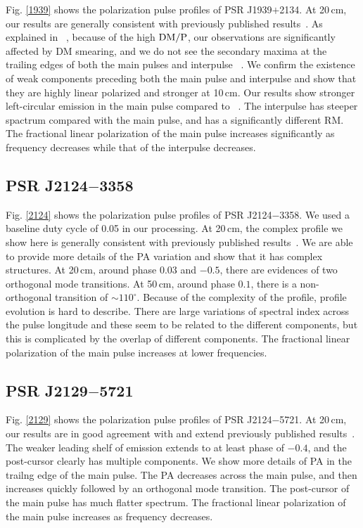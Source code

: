 \documentclass[useAMS,usenatbib]{mn2e}
\begin{document}
\begin{appendix}
Fig. \ref{1939} shows the polarization pulse profiles of 
PSR J1939$+$2134.
%
At 20\,cm, our results are generally consistent with previously published 
results~\citep{Yan11}.
%
As explained in ~\citet{Yan11}, because of the high $\rm{DM}/P$, our observations 
are significantly affected by DM smearing, and we do not see the secondary 
maxima at the trailing edges of both the main pulses and interpulse
~\citep{Thorsett90,Stairs99,Ord04}.
%
We confirm the existence of weak components preceding both the main pulse 
and interpulse and show that they are highly linear polarized and stronger 
at 10\,cm. 
%
Our results show stronger left-circular emission in the main pulse compared 
to ~\citet{Yan11}.
%
The interpulse has steeper spactrum compared with the main pulse, and has 
a significantly different RM.
%
The fractional linear polarization of the main pulse increases significantly 
as frequency decreases while that of the interpulse decreases.

\subsection{PSR J2124$-$3358}

Fig. \ref{2124} shows the polarization pulse profiles of 
PSR J2124$-$3358.
%
We used a baseline duty cycle of 0.05 in our processing.
%
At 20\,cm, the complex profile we show here is generally consistent with 
previously published results~\citep{Yan11}.
%
We are able to provide more details of the PA variation and show that it has 
complex structures.
%
At 20\,cm, around phase $0.03$ and $-0.5$, there are evidences of two 
orthogonal mode transitions.
%
At 50\,cm, around phase $0.1$, there is a non-orthogonal transition of 
$\sim110^{\circ}$.
%
Because of the complexity of the profile, profile evolution is hard to 
describe. There are large variations of spectral index across the pulse 
longitude and these seem to be related to the different components, but 
this is complicated by the overlap of different components.
%
The fractional linear polarization of the main pulse increases at lower 
frequencies.

\subsection{PSR J2129$-$5721}

Fig. \ref{2129} shows the polarization pulse profiles of 
PSR J2124$-$5721.
%
At 20\,cm, our results are in good agreement with and extend previously 
published results~\citep{Yan11}.
%
The weaker leading shelf of emission extends to at least phase of $-0.4$, and 
the post-cursor clearly has multiple components.
%
We show more details of PA in the trailng edge of the main pulse.  
%
The PA decreases across the main pulse, and then increases quickly followed 
by an orthogonal mode transition.
%
The post-cursor of the main pulse has much flatter spectrum.
%
The fractional linear polarization of the main pulse increases as frequency 
decreases.


\end{appendix}
\end{document}
